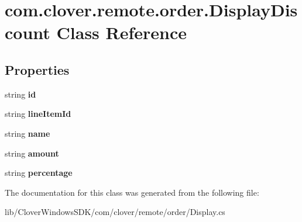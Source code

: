 \hypertarget{classcom_1_1clover_1_1remote_1_1order_1_1_display_discount}{}\section{com.\+clover.\+remote.\+order.\+Display\+Discount Class Reference}
\label{classcom_1_1clover_1_1remote_1_1order_1_1_display_discount}
\subsection*{Properties}
\begin{DoxyCompactItemize}
\item 
\mbox{\label{classcom_1_1clover_1_1remote_1_1order_1_1_display_discount_acb785f196d7195fd780ef3b9c4a60641}} 
string {\bfseries id}
\item 
\mbox{\label{classcom_1_1clover_1_1remote_1_1order_1_1_display_discount_a44c2e4eb2f4fa2585f54b6e80fd3f55d}} 
string {\bfseries line\+Item\+Id}
\item 
\mbox{\label{classcom_1_1clover_1_1remote_1_1order_1_1_display_discount_a0cfce5595f1918ca2f49c9b92003d65f}} 
string {\bfseries name}
\item 
\mbox{\label{classcom_1_1clover_1_1remote_1_1order_1_1_display_discount_a675ce8ffc39b916aefe5d246a7aec5bb}} 
string {\bfseries amount}
\item 
\mbox{\label{classcom_1_1clover_1_1remote_1_1order_1_1_display_discount_a98f6bfed530a89d304b48cfd3f76ce6c}} 
string {\bfseries percentage}
\end{DoxyCompactItemize}


The documentation for this class was generated from the following file\+:\begin{DoxyCompactItemize}
\item 
lib/\+Clover\+Windows\+S\+D\+K/com/clover/remote/order/Display.\+cs\end{DoxyCompactItemize}
